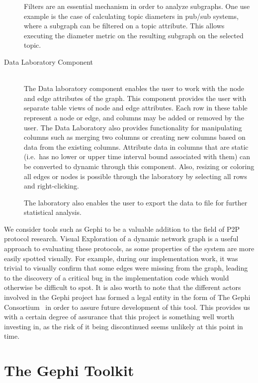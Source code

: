 \begin{description}
    Filters are an essential mechanism in order to analyze subgraphs.
    One use example is the case of calculating topic diameters in pub/sub systems,
    where a subgraph can be filtered on a topic attribute. This
    allows executing the diameter metric on the resulting subgraph
    on the selected topic.

\item[Data Laboratory Component] \hfill \\

    The Data laboratory component enables the user to work with the node
    and edge attributes of the graph. This component provides the user
    with separate table views of node and edge attributes. Each row in
    these table represent a node or edge, and columns may be added or
    removed by the user. The Data Laboratory also provides functionality
    for manipulating columns such as merging two columns or creating new
    columns based on data from the existing columns. Attribute data
    in columns that are static (i.e.\ has no lower or upper time
    interval bound associated with them) can be converted to dynamic
    through this component. Also, resizing or coloring all edges or
    nodes is possible through the laboratory by selecting all rows
    and right-clicking.

    The laboratory also enables the user to export the data to file
    for further statistical analysis.
\end{description}

We consider tools such as Gephi to be a valuable addition to the field
of P2P protocol research. Visual Exploration of a dynamic network graph
is a useful approach to evaluating these protocols, as some properties
of the system are more easily spotted visually. For example, during our
implementation work, it was trivial to visually confirm that some edges
were missing from the graph, leading to the discovery of a critical bug
in the implementation code which would otherwise be difficult to spot.
It is also worth to note that the different actors involved in the Gephi
project has formed a legal entity in the form of The Gephi
Consortium~\cite{gephi-consortium} in order to assure future development
of this tool. This provides us with a certain degree of assurance that
this project is something well worth investing in, as the risk of it
being discontinued seems unlikely at this point in time.

\section{The Gephi Toolkit}

